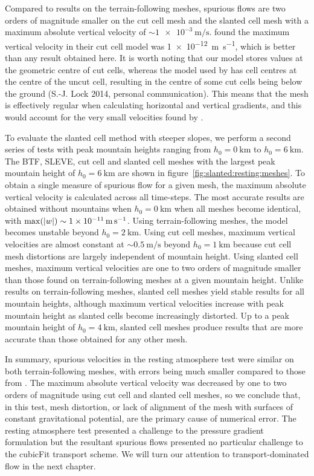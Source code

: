 Compared to results on the terrain-following meshes, spurious flows are two orders of magnitude smaller on the cut cell mesh and the slanted cell mesh with a maximum absolute vertical velocity of $\sim \SI{1e-3}{\meter\per\second}$.
\citet{good2014} found the maximum vertical velocity in their cut cell model was \SI{1e-12}{\meter\per\second}, which is better than any result obtained here.  It is worth noting that our model stores values at the geometric centre of cut cells, whereas the model used by \citet{good2014} has cell centres at the centre of the uncut cell, resulting in the centre of some cut cells being below the ground (S.-J. Lock 2014, personal communication).
This means that the mesh is effectively regular when calculating horizontal and vertical gradients, and this would account for the very small velocities found by \citet{good2014}.

To evaluate the slanted cell method with steeper slopes, we perform a second series of tests with peak mountain heights ranging from $h_0 = \SI{0}{\kilo\meter}$ to $h_0 = \SI{6}{\kilo\meter}$.
The BTF, SLEVE, cut cell and slanted cell meshes with the largest peak mountain height of $h_0 = \SI{6}{\kilo\meter}$ are shown in figure~\ref{fig:slanted:resting:meshes}.
To obtain a single measure of spurious flow for a given mesh, the maximum absolute vertical velocity is calculated across all time-steps.
The most accurate results are obtained without mountains when $h_0 = \SI{0}{\kilo\meter}$ when all meshes become identical, with $\max(\left\lvert w \right\rvert) \sim \SI{1e-11}{\meter\per\second}$.
Using terrain-following meshes, the model becomes unstable beyond $h_0 = \SI{2}{\kilo\meter}$.
Using cut cell meshes, maximum vertical velocities are almost constant at $\sim \SI{0.5}{\meter\per\second}$ beyond $h_0 = \SI{1}{\kilo\meter}$ because cut cell mesh distortions are largely independent of mountain height.
Using slanted cell meshes, maximum vertical velocities are one to two orders of magnitude smaller than those found on terrain-following meshes at a given mountain height.  Unlike results on terrain-following meshes, slanted cell meshes yield stable results for all mountain heights, although maximum vertical velocities increase with peak mountain height as slanted cells become increasingly distorted.  Up to a peak mountain height of $h_0 = \SI{4}{\kilo\meter}$, slanted cell meshes produce results that are more accurate than those obtained for any other mesh.

In summary, spurious velocities in the resting atmosphere test were similar on both terrain-following meshes, with errors being much smaller compared to those from \citet{klemp2011}.
The maximum absolute vertical velocity was decreased by one to two orders of magnitude using cut cell and slanted cell meshes, so we conclude that, in this test, mesh distortion, or lack of alignment of the mesh with surfaces of constant gravitational potential, are the primary cause of numerical error.
The resting atmosphere test presented a challenge to the pressure gradient formulation but the resultant spurious flows presented no particular challenge to the cubicFit transport scheme.  We will turn our attention to transport-dominated flow in the next chapter.
